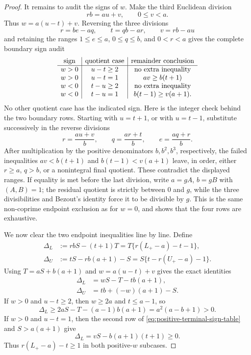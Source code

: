 \begin{proof}
It remains to audit the signs of $w$.  Make the third Euclidean division
\begin{equation}
rb=au+v,\qquad 0\le v<a.
\label{eq:positive-third-division}
\end{equation}
Thus $w=a(u-t)+v$.  Reversing the three divisions
\[
r=be-aq,\qquad t=qb-ar,\qquad v=rb-au
\]
and retaining the ranges $1\le e\le a$, $0\le q\le b$, and $0<r<a$
gives the complete boundary sign audit
\begin{equation}
\begin{array}{c|c|c}
\text{sign}&\text{quotient case}&\text{remainder conclusion}\\ \hline
w>0&u-t\ge2&\text{no extra inequality}\cr
w>0&u-t=1&av\ge b(t+1)\cr
w<0&t-u\ge2&\text{no extra inequality}\cr
w<0&t-u=1&b(t-1)\ge v(a+1).
\end{array}
\label{eq:positive-terminal-sign-table}
\end{equation}
No other quotient case has the indicated sign.  Here is the integer check
behind the two boundary rows.  Starting with $u=t+1$, or with $u=t-1$,
substitute successively in the reverse divisions
\[
r=\frac{au+v}{b},\qquad
q=\frac{ar+t}{b},\qquad
e=\frac{aq+r}{b}.
\]
After multiplication by the positive denominators $b,b^2,b^3$, respectively,
the failed inequalities $av<b(t+1)$ and $b(t-1)<v(a+1)$ leave, in order,
either $r\ge a$, $q>b$, or a nonintegral final quotient.  These contradict
the displayed ranges.  If equality is met before the last division, write
$a=gA$, $b=gB$ with $(A,B)=1$; the residual quotient is strictly between
$0$ and $g$, while the three divisibilities and Bezout's identity force it
to be divisible by $g$.  This is the same non-coprime endpoint exclusion as
for $w=0$, and shows that the four rows are exhaustive.

We now clear the two endpoint inequalities line by line.  Define
\begin{align*}
\Delta_L&:=rbS-(t+1)T
          =T\{r(L_+-a)-t-1\},\\
\Delta_U&:=tS-rb(a+1)-S
          =S\{t-r(U_+-a)-1\}.
\end{align*}
Using $T=aS+b(a+1)$ and $w=a(u-t)+v$ gives the exact identities
\begin{align}
\Delta_L&=wS-T-tb(a+1),
\label{eq:positive-terminal-left-clear}\\
\Delta_U&=tb+(-w)(a+1)-S.
\label{eq:positive-terminal-right-clear}
\end{align}
If $w>0$ and $u-t\ge2$, then $w\ge2a$ and $t\le a-1$, so
\[
\Delta_L
\ge2aS-T-(a-1)b(a+1)
=a^2(a-b+1)>0.
\]
If $w>0$ and $u-t=1$, then the second row of
\eqref{eq:positive-terminal-sign-table} and $S>a(a+1)$ give
\[
\Delta_L=vS-b(a+1)(t+1)\ge0.
\]
Thus $r(L_+-a)-t\ge1$ in both positive-$w$ subcases.


\end{proof}
